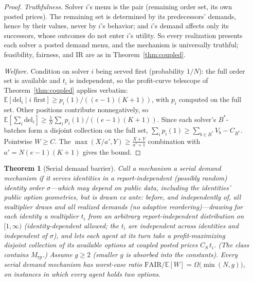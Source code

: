 \documentclass[11pt]{article}
\newtheorem{theorem}{Theorem}
\theoremstyle{remark}
\newcommand{\FAIR}{\mathrm{FAIR}}
\newcommand{\E}{\mathbb{E}}
\begin{document}
\begin{proof}
\emph{Truthfulness.} Solver $i$'s menu is the pair (remaining order set,
its own posted prices). The remaining set is determined by its
predecessors' demands, hence by their values, never by $i$'s behavior; and
$i$'s demand affects only its successors, whose outcomes do not enter
$i$'s utility. So every realization presents each solver a posted demand
menu, and the mechanism is universally truthful; feasibility, fairness,
and IR are as in Theorem~\ref{thm:coupled}.

\emph{Welfare.} Condition on solver $i$ being served first (probability
$1/N$): the full order set is available and $t_i$ is independent, so the
profit-curve telescope of Theorem~\ref{thm:coupled} applies verbatim:
$\E[\mathrm{del}_i\mid i\text{ first}]\ge p_i(1)/((e-1)(K+1))$, with
$p_i$ computed on the full set. Other positions contribute nonnegatively,
so $\E[\sum_i\mathrm{del}_i]\ge\frac1N\sum_i p_i(1)/((e-1)(K+1))$. Since
each solver's $B^\ast$-batches form a disjoint collection on the full set,
$\sum_i p_i(1)\ge\sum_{b\in B^\ast}V_b-C_{B^\ast}$. Pointwise $W\ge C$.
The $\max(X/a',Y)\ge\frac{X+Y}{a'+1}$ combination with
$a'=N(e-1)(K+1)$ gives the bound.
\end{proof}

\begin{theorem}[Serial demand barrier]\label{thm:serialbarrier}
Call a mechanism a \emph{serial demand mechanism} if it serves identities
in a report-independent (possibly random) identity order $\sigma$---which
may depend on public data, including the identities' public option
geometries, but is drawn \emph{ex ante}: before, and independently of,
all multiplier draws and all realized demands (no adaptive
reordering)---drawing for each identity a multiplier $t_i$ from an
arbitrary report-independent distribution on $[1,\infty)$
(identity-dependent allowed; the $t_i$ are independent across identities
and independent of $\sigma$), and lets each agent at its turn take
a profit-maximizing disjoint collection of its available options at
coupled posted prices $C_S\,t_i$. (The class contains
$M_{\mathrm{rp}}$.) Assume $g\ge2$ (smaller $g$ is absorbed into the
constants). Every serial demand mechanism has worst-case ratio
$\FAIR/\E[W]=\Omega\big(\min(N,g)\big)$, on instances in which every
agent holds two options.
\end{theorem}
\end{document}
